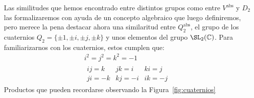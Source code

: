 \begin{ejemplo}
    Las similitudes que hemos encontrado entre distintos grupos como entre $V^{\text{abs}}$ y $D_2$ las formalizaremos con ayuda de un concepto algebraico que luego definiremos, pero merece la pena destacar ahora una similaritud entre $Q_2^{\text{abs}}$, el grupo de los cuaternios $Q_2 = \{\pm 1, \pm i,\pm j,\pm k\}$ y unos elementos del grupo $\SL_2(\mathbb{C})$. Para familiarizarnos con los cuaternios, estos cumplen que:
    \begin{gather*}
        i^2 = j^2 = k^2 = -1 \\
        \begin{array}{ccc}
            ij = k & jk = i & ki = j \\
            ji = -k & kj = -i & ik = -j
        \end{array}
    \end{gather*}
    Productos que pueden recordarse observando la Figura~\ref{fig:cuaternios}
    \begin{figure}[H]
        \centering
\end{figure}
\end{ejemplo}
